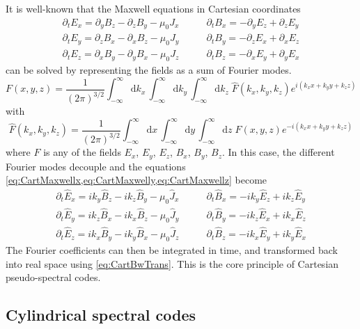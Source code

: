 \documentclass[a4paper]{article}   	%
\newcommand{\Integ}[1]{\int_{-\infty}^{\infty} \!\!\!\!\! \mathrm{d}#1}
\begin{document}
It is well-known that the Maxwell equations in Cartesian coordinates 
\begin{align}
\partial_t E_x = \partial_y B_z - \partial_z B_y - \mu_0  J_x \qquad&   
\partial_t B_x = -\partial_y E_z + \partial_z E_y \label{eq:CartMaxwellx} \\
\partial_t E_y = \partial_z B_x - \partial_x B_z - \mu_0  J_y \qquad &   
\partial_t B_y = -\partial_z E_x + \partial_x E_z \label{eq:CartMaxwelly}  \\
\partial_t E_z = \partial_x B_y - \partial_y B_x - \mu_0  J_z \qquad &   
\partial_t B_z = -\partial_x E_y + \partial_y E_x \label{eq:CartMaxwellz} 
\end{align}
can be solved by representing the fields as a sum of Fourier modes.
\begin{equation}
\label{eq:CartBwTrans}
F(x,y,z) = \frac{1}{(2\pi)^{3/2}}\Integ{k_x} \,\Integ{k_y}\, \Integ{k_z} \; \hat{F}(k_x,k_y,k_z) e^{i(k_x x + k_y y + k_z z)} 
\end{equation}
with 
\begin{equation}
\label{eq:CartFwTrans}
\hat{F}(k_x,k_y,k_z)  = \frac{1}{(2\pi)^{3/2}}\Integ{x} \,\Integ{y}\, \Integ{z} \; F(x,y,z) e^{-i(k_x x + k_y y + k_z z)} 
\end{equation}
where $F$ is any of the fields $E_x$, $E_y$, $E_z$, $B_x$, $B_y$, $B_z$. In this case, the different Fourier modes decouple and the equations \cref{eq:CartMaxwellx,eq:CartMaxwelly,eq:CartMaxwellz} become 
\begin{align}
\partial_t \hat{E}_x = ik_y \hat{B}_z - ik_z \hat{B}_y - \mu_0 \hat{J}_x \qquad &   
\partial_t \hat{B}_x = -ik_y \hat{E}_z + ik_z \hat{E}_y \\
\partial_t \hat{E}_y = ik_z \hat{B}_x - ik_x \hat{B}_z - \mu_0  \hat{J}_y \qquad &   
\partial_t \hat{B}_y = -ik_z \hat{E}_x + ik_x \hat{E}_z \\
\partial_t \hat{E}_z = ik_x \hat{B}_y - ik_y \hat{B}_x - \mu_0 \hat{J}_z  \qquad &   
\partial_t \hat{B}_z = -ik_x \hat{E}_y + ik_y \hat{E}_x 
\end{align}
The Fourier coefficients can then be integrated in time, and
transformed back into real space using \cref{eq:CartBwTrans}. This is
the core principle of Cartesian pseudo-spectral codes.

\subsection{Cylindrical spectral codes}
\end{document}
